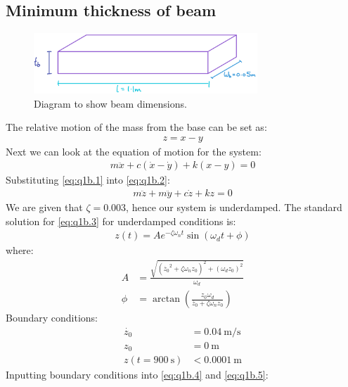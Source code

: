 \documentclass[11pt]{article}
\numberwithin{equation}{section}
\begin{document}
\subsection{Minimum thickness of beam}
\begin{figure}[H]
    \centering
    \includegraphics[width = 0.75\textwidth]{./img/q1b.png}
    \caption{Diagram to show beam dimensions.}
    \label{q1b}
\end{figure}
The relative motion of the mass from the base can be set as:
\begin{gather}
    z = x - y\label{eq:q1b.1}
\end{gather}
Next we can look at the equation of motion for the system:
\begin{gather}
    m\ddot{x} + c \left(\dot{x} - \dot{y}\right) + k \left(x- y \right) = 0\label{eq:q1b.2}
\end{gather}
Substituting \ref{eq:q1b.1} into \ref{eq:q1b.2}:
\begin{gather}
    m \ddot{z} + m\ddot{y} + c\dot{z} + kz = 0\label{eq:q1b.3}
\end{gather}
We are given that $\zeta = 0.003$, hence our system is underdamped. The standard solution for \ref{eq:q1b.3} for underdamped conditions is:
\begin{gather}
    z\left(t\right) = Ae^{-\zeta \omega_n t} \sin\left(\omega_d t + \phi\right) \label{eq:q1b.9}
\end{gather}
where:
\begin{align}
    A    & = \frac{\sqrt{\left(\dot{z_0}^2 + \zeta \omega_n z_0 \right)^2 + \left(\omega_d z_0\right)^2}}{\omega_d} \label{eq:q1b.4} \\
    \phi & = \arctan \left(\frac{z_0 \omega_d}{\dot{z_0} + \zeta \omega_n z_0}\right) \label{eq:q1b.5}
\end{align}
Boundary conditions:
\begin{align}
    \dot{z_0}                           & = \SI{0.04}{\meter\per\second} \\
    z_0                                 & = \SI{0}{\meter}               \\
    z\left(t = \SI{900}{\second}\right) & < \SI{0.0001}{\meter}
\end{align}
Inputting boundary conditions into \ref{eq:q1b.4} and \ref{eq:q1b.5}:
\end{document}

